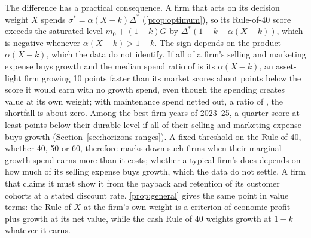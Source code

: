 The difference has a practical consequence. A firm that acts on its decision weight $X$ spends $\sigma^*=\alpha(X-k)\Delta^*$ (\autoref{prop:optimum}), so its Rule-of-40 score exceeds the saturated level $m_0+(1-k)G$ by $\Delta^*(1-k-\alpha(X-k))$, which is negative whenever $\alpha(X-k)>1-k$. The sign depends on the product $\alpha(X-k)$, which the data do not identify. If all of a firm's selling and marketing expense buys growth and the median spend ratio of \SpendEone{} is its $\alpha(X-k)$, an asset-light firm growing 10 points faster than its market scores about \SpendPenaltyTen{} points below the score it would earn with no growth spend, even though the spending creates value at its own weight; with maintenance spend netted out, a ratio of \AlphaNet, the shortfall is about zero. Among the best firm-years of 2023--25, a quarter score at least \AnchorPiLoAbs{} points below their durable level if all of their selling and marketing expense buys growth (Section~\ref{sec:horizons-ranges}). A fixed threshold on the Rule of 40, whether 40, 50 or 60, therefore marks down such firms when their marginal growth spend earns more than it costs; whether a typical firm's does depends on how much of its selling expense buys growth, which the data do not settle. A firm that claims it must show it from the payback and retention of its customer cohorts at a stated discount rate. \autoref{prop:general} gives the same point in value terms: the Rule of $X$ at the firm's own weight is a criterion of economic profit plus growth at its net value, while the cash Rule of 40 weights growth at $1-k$ whatever it earns.

